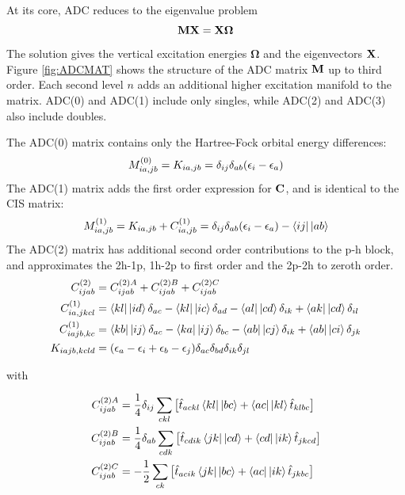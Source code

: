 At its core, ADC reduces to the eigenvalue problem
\begin{equation}
\mathbf{M}\mathbf{X} = \mathbf{X}\boldsymbol{\Omega}
\label{eq:ADCEVAL}
\end{equation}
\noindent The solution gives the vertical excitation energies $\boldsymbol{\Omega}$ and the eigenvectors $\mathbf{X}$. Figure \ref{fig:ADCMAT} shows the structure of the ADC matrix $\mathbf{M}$ up to third order. Each second level $n$ adds an additional higher excitation manifold to the matrix. ADC(0) and ADC(1) include only singles, while ADC(2) and ADC(3) also include doubles.

The ADC(0) matrix contains only the Hartree-Fock orbital energy differences:
\begin{equation}
M^{(0)}_{ia,jb} = K_{ia,jb} = \delta_{ij}\delta_{ab} (\epsilon_i - \epsilon_a) 
\end{equation}
\noindent The ADC(1) matrix adds the first order expression for $\mathbf{C}$, and is identical to the CIS matrix:
\begin{equation}
M^{(1)}_{ia,jb} = K_{ia,jb} + C_{ia,jb}^{(1)} = \delta_{ij}\delta_{ab} (\eps_i - \eps_a) - \sbra{ij}\sket{ab}
\end{equation} 
\noindent The ADC(2) matrix has additional second order contributions to the p-h block, and approximates the 2h-1p, 1h-2p to first order and the 2p-2h to zeroth order. 
\begin{align}
C_{ijab}^{(2)} &= C_{ijab}^{(2)A} + C_{ijab}^{(2)B} + C_{ijab}^{(2)C} 
\\
C_{ia,jkcl}^{(1)} &= \sbra{kl} \sket{id} \delta_{ac} - \sbra{kl} \sket{ic} \delta_{ad} - \sbra{al} \sket{cd} \delta_{ik} + \sbra{ak} \sket{cd} \delta_{il} 
\\
C_{iajb,kc}^{(1)} &= \sbra{kb} \sket{ij} \delta_{ac} - \sbra{ka} \sket{ij} \delta_{bc} - \bra{ab} \sket{cj} \delta_{ik} + \sbra{ab} \sket{ci} \delta_{jk} 
\\
K_{iajb,kcld} &= (\epsilon_a - \epsilon_i + \epsilon_b - \epsilon_j) \delta_{ac} \delta_{bd} \delta_{ik} \delta_{jl} 
\end{align}

\noindent with

\begin{align}
C_{ijab}^{(2)A} &= \frac{1}{4} \delta_{ij} \sum_{ckl} \left[  \hat{t}_{ackl} \sbra{kl} \sket{bc}  +  \sbra{ac} \sket{kl} \hat{t}_{klbc}\right] \\
C_{ijab}^{(2)B} &= \frac{1}{4} \delta_{ab} \sum_{cdk} \left[ \hat{t}_{cdik} \sbra{jk} \sket{cd} + \sbra{cd} \sket{ik} \hat{t}_{jkcd} \right] \\
C_{ijab}^{(2)C} &= - \frac{1}{2} \sum_{ck} \left[ \hat{t}_{acik}  \sbra{jk} \sket{bc} + \sbra{ac} \sket{ik} \hat{t}_{jkbc} \right] 
\end{align}

